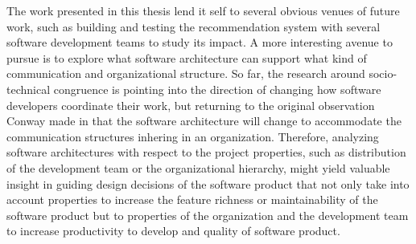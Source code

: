 The work presented in this thesis lend it self to several obvious venues of future work, such as building and testing the recommendation system with several software development teams to study its impact.
A more interesting avenue to pursue is to explore what software architecture can support what kind of communication and organizational structure.
So far, the research around socio-technical congruence is pointing into the direction of changing how software developers coordinate their work, but returning to the original observation Conway made in that the software architecture will change to accommodate the communication structures inhering in an organization.
Therefore, analyzing software architectures with respect to the project properties, such as distribution of the development team or the organizational hierarchy, might yield valuable insight in guiding design decisions of the software product that not only take into account properties to increase the feature richness or maintainability of the software product but to properties of the organization and the development team to increase productivity to develop and quality of software product. 
